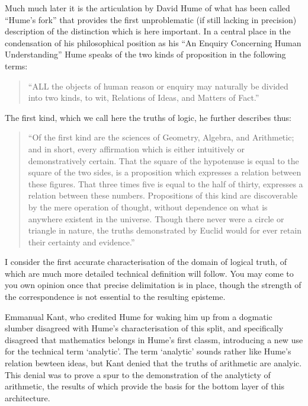 \documentclass[10pt,titlepage]{book}
\begin{document}
Much much later it is the articulation by David Hume of what has been called ``Hume's fork'' that provides the first unproblematic (if still lacking in precision) description of the distinction which is here important.
In a central place in the condensation of his philosophical position as his ``An Enquiry Concerning Human Understanding'' \cite{hume48} Hume speaks of the two kinds of proposition in the following terms:

\begin{quote}
``ALL the objects of human reason or enquiry may naturally be divided
  into two kinds, to wit, Relations of Ideas, and Matters of Fact.'' 
\end{quote}

The first kind, which we call here the truths of logic, he further describes thus:

\begin{quote}
``Of the first kind are the sciences of Geometry, Algebra, and
Arithmetic; and in short, every affirmation which is either
intuitively or demonstratively certain.
That the square of the hypotenuse is equal to the square of the two
sides, is a proposition which expresses a relation between these
figures.
That three times five is equal to the half of thirty, expresses a
relation between these numbers.
Propositions of this kind are discoverable by the mere operation of
thought, without dependence on what is anywhere existent in the
universe.
Though there never were a circle or triangle in nature, the truths
demonstrated by Euclid would for ever retain their certainty and
evidence.''
\end{quote}

I consider the first accurate characterisation of the domain of logical truth, of which are much more detailed technical definition will follow.
You may come to you own opinion once that precise delimitation is in place, though the strength of the correspondence is not essential to the resulting episteme.

Emmanual Kant, who credited Hume for waking him up from a dogmatic slumber disagreed with Hume's characterisation of this split, and specifically disagreed that mathematics belongs in Hume's first classm, introducing a new use for the technical term `analytic'.
The term `analytic' sounds rather like Hume's relation bewteen ideas, but Kant denied that the truths of arithmetic are analyic.
This denial was to prove a spur to the demonstration of the analyticty of arithmetic, the results of which provide the basis for the bottom layer of this architecture.
\end{document}
